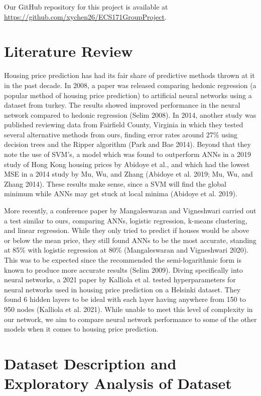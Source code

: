 \documentclass[12pt]{article}
\begin{document}
	Our GitHub repository for this project is available at \url{https://github.com/xychen26/ECS171GroupProject}.
	
	\section{Literature Review}
		
	Housing price prediction has had its fair share of predictive methods thrown at it in the past decade. In 2008, a paper was released comparing hedonic regression (a popular method of housing price prediction) to artificial neural networks using a dataset from turkey. The results showed improved performance in the neural network compared to hedonic regression (Selim 2008). In 2014, another study was published reviewing data from Fairfield County, Virginia in which they tested several alternative methods from ours, finding error rates around 27\% using decision trees and the Ripper algorithm (Park and Bae 2014). Beyond that they note the use of SVM’s, a model which was found to outperform ANNs in a 2019 study of Hong Kong housing prices by Abidoye et al., and which had the lowest MSE in a 2014 study by Mu, Wu, and Zhang (Abidoye et al. 2019; Mu, Wu, and Zhang 2014). These results make sense, since a SVM will find the global minimum while ANNs may get stuck at local minima (Abidoye et al. 2019).
	
	More recently, a conference paper by Mangaleswaran and Vigneshwari carried out a test similar to ours, comparing ANNs, logistic regression, k-means clustering, and linear regression. While they only tried to predict if houses would be above or below the mean price, they still found ANNs to be the most accurate, standing at 85\% with logistic regression at 80\% (Mangaleswaran and Vigneshwari 2020). This was to be expected since the recommended the semi-logarithmic form is known to produce more accurate results (Selim 2009). Diving specifically into neural networks, a 2021 paper by Kalliola et al. tested hyperparameters for neural networks used in housing price prediction on a Helsinki dataset. They found 6 hidden layers to be ideal with each layer having anywhere from 150 to 950 nodes (Kalliola et al. 2021). While unable to meet this level of complexity in our network, we aim to compare neural network performance to some of the other models when it comes to housing price prediction.
	
	\section{Dataset Description and Exploratory Analysis of Dataset}
	
\end{document}

